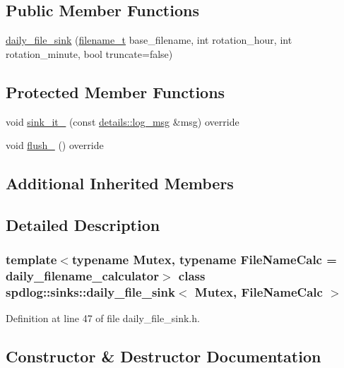 \subsection*{Public Member Functions}
\begin{DoxyCompactItemize}
\item 
\hyperlink{classspdlog_1_1sinks_1_1daily__file__sink_a442164b0813283bc631ad39708fb3669}{daily\+\_\+file\+\_\+sink} (\hyperlink{namespacespdlog_acf7ce125b3622e44f8f1702d699e0b06}{filename\+\_\+t} base\+\_\+filename, int rotation\+\_\+hour, int rotation\+\_\+minute, bool truncate=false)
\end{DoxyCompactItemize}
\subsection*{Protected Member Functions}
\begin{DoxyCompactItemize}
\item 
void \hyperlink{classspdlog_1_1sinks_1_1daily__file__sink_ac82447cddb7a2ddb45ab81f97b74286d}{sink\+\_\+it\+\_\+} (const \hyperlink{structspdlog_1_1details_1_1log__msg}{details\+::log\+\_\+msg} \&msg) override
\item 
void \hyperlink{classspdlog_1_1sinks_1_1daily__file__sink_a37199f25868ac70b91e4f126bcc4b3f8}{flush\+\_\+} () override
\end{DoxyCompactItemize}
\subsection*{Additional Inherited Members}


\subsection{Detailed Description}
\subsubsection*{template$<$typename Mutex, typename File\+Name\+Calc = daily\+\_\+filename\+\_\+calculator$>$\newline
class spdlog\+::sinks\+::daily\+\_\+file\+\_\+sink$<$ Mutex, File\+Name\+Calc $>$}



Definition at line 47 of file daily\+\_\+file\+\_\+sink.\+h.



\subsection{Constructor \& Destructor Documentation}
\mbox{\label{classspdlog_1_1sinks_1_1daily__file__sink_a442164b0813283bc631ad39708fb3669}} 
